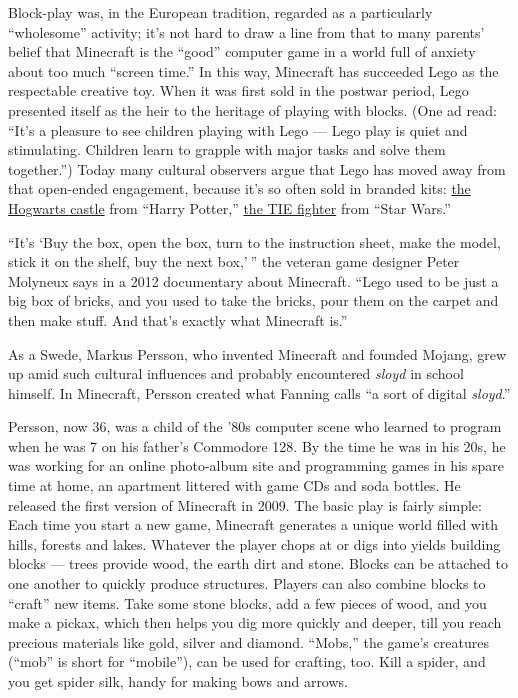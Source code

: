 Block-play was, in the European tradition, regarded as a particularly
``wholesome'' activ­ity; it's not hard to draw a line from that to many
parents' belief that Minecraft is the ``good'' computer game in a world
full of anxiety about too much ``screen time.'' In this way, Minecraft
has succeeded Lego as the respectable creative toy. When it was first
sold in the postwar period, Lego presented itself as the heir to the
heritage of playing with blocks. (One ad read: ``It's a pleasure to see
children playing with Lego --- Lego play is quiet and stimulating.
Children learn to grapple with major tasks and solve them together.'')
Today many cultural observers argue that Lego has moved away from that
open-­ended engagement, because it's so often sold in branded kits:
\href{http://lego.brickinstructions.com/m/lego_instructions/set/4842/Hogwarts_Castle_}{the
Hogwarts castle} from ``Harry Potter,''
\href{http://lego.brickinstructions.com/lego_instructions/set/7146/TIE_Fighter}{the
TIE fighter} from ``Star Wars.''

``It's `Buy the box, open the box, turn to the instruction sheet, make
the model, stick it on the shelf, buy the next box,' '' the veteran
­game designer Peter Molyneux says in a 2012 documentary about
Minecraft. ``Lego used to be just a big box of bricks, and you used to
take the bricks, pour them on the carpet and then make stuff. And that's
exactly what Minecraft is.''

As a Swede, Markus Persson, who invented Minecraft and founded Mojang,
grew up amid such cultural influences and probably encountered
\emph{sloyd} in school himself. In Minecraft, Persson created what
Fanning calls ``a sort of digital \emph{sloyd}.''

Persson, now 36, was a child of the '80s computer scene who learned to
program when he was 7 on his father's Commodore 128. By the time he was
in his 20s, he was working for an online photo-­album site and
programming games in his spare time at home, an apartment littered with
game CDs and soda bottles. He released the first version of Minecraft in
2009. The basic play is fairly simple: Each time you start a new game,
Minecraft generates a unique world filled with hills, forests and lakes.
Whatever the player chops at or digs into yields building blocks ---
trees provide wood, the earth dirt and stone. Blocks can be attached to
one another to quickly produce structures. Players can also combine
blocks to ``craft'' new items. Take some stone blocks, add a few pieces
of wood, and you make a pickax, which then helps you dig more quickly
and deeper, till you reach precious materials like gold, silver and
diamond. ``Mobs,'' the game's creatures (``mob'' is short for
``mobile''), can be used for crafting, too. Kill a spider, and you get
spider silk, handy for making bows and arrows.

